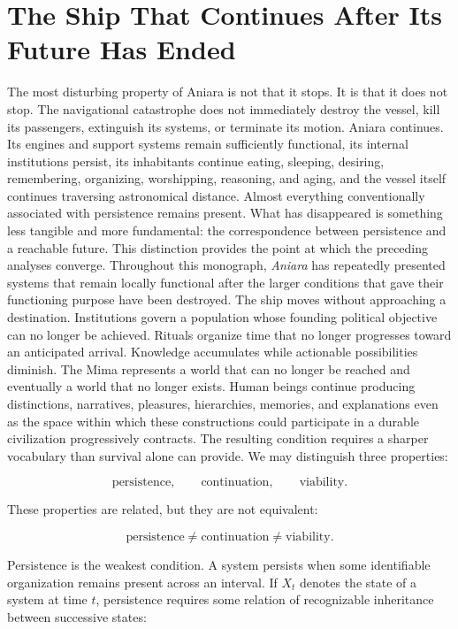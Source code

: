 \documentclass[11pt,oneside]{book}
\theoremstyle{definition}
\theoremstyle{remark}
\begin{document}
\chapter{The Ship That Continues After Its Future Has Ended}

\label{chap:future-ended}

The most disturbing property of Aniara is not that it stops. It is that it does not stop. The
navigational catastrophe does not immediately destroy the vessel, kill its passengers, extinguish
its systems, or terminate its motion. Aniara continues. Its engines and support systems remain
sufficiently functional, its internal institutions persist, its inhabitants continue eating,
sleeping, desiring, remembering, organizing, worshipping, reasoning, and aging, and the vessel
itself continues traversing astronomical distance. Almost everything conventionally associated with
persistence remains present. What has disappeared is something less tangible and more fundamental:
the correspondence between persistence and a reachable future. This distinction provides the point
at which the preceding analyses converge. Throughout this monograph, \emph{Aniara} has repeatedly
presented systems that remain locally functional after the larger conditions that gave their
functioning purpose have been destroyed. The ship moves without approaching a destination.
Institutions govern a population whose founding political objective can no longer be achieved.
Rituals organize time that no longer progresses toward an anticipated arrival. Knowledge accumulates
while actionable possibilities diminish. The Mima represents a world that can no longer be reached
and eventually a world that no longer exists. Human beings continue producing distinctions,
narratives, pleasures, hierarchies, memories, and explanations even as the space within which these
constructions could participate in a durable civilization progressively contracts. The resulting
condition requires a sharper vocabulary than survival alone can provide. We may distinguish three
properties:

\[
\text{persistence}, \qquad \text{continuation}, \qquad \text{viability}.
\]

These properties are related, but they are not equivalent:

\[
\boxed{ \text{persistence} \neq \text{continuation} \neq \text{viability} }.
\]

Persistence is the weakest condition. A system persists when some identifiable organization remains
present across an interval. If \(X_t\) denotes the state of a system at time \(t\), persistence
requires some relation of recognizable inheritance between successive states:
\end{document}
